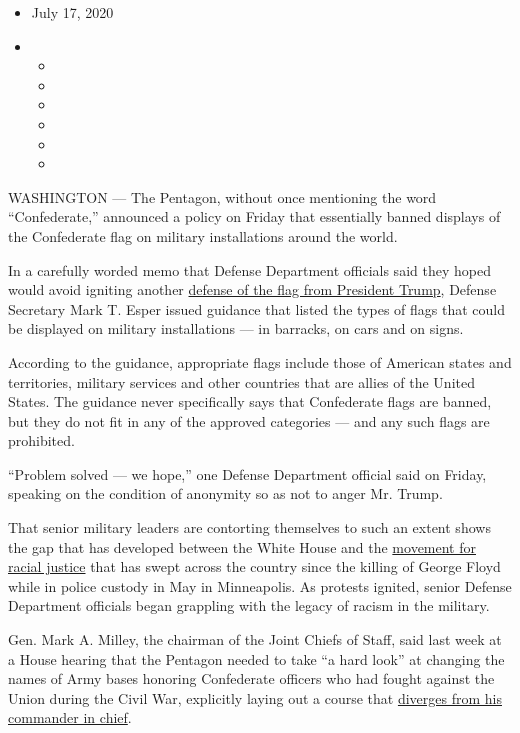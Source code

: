 \begin{itemize}
\item
  July 17, 2020
\item
  \begin{itemize}
  \item
  \item
  \item
  \item
  \item
  \item
  \end{itemize}
\end{itemize}

WASHINGTON --- The Pentagon, without once mentioning the word
``Confederate,'' announced a policy on Friday that essentially banned
displays of the Confederate flag on military installations around the
world.

In a carefully worded memo that Defense Department officials said they
hoped would avoid igniting another
\href{https://www.nytimes.com/2020/07/06/us/politics/trump-bubba-wallace-nascar.html}{defense
of the flag from President Trump}, Defense Secretary Mark T. Esper
issued guidance that listed the types of flags that could be displayed
on military installations --- in barracks, on cars and on signs.

According to the guidance, appropriate flags include those of American
states and territories, military services and other countries that are
allies of the United States. The guidance never specifically says that
Confederate flags are banned, but they do not fit in any of the approved
categories --- and any such flags are prohibited.

``Problem solved --- we hope,'' one Defense Department official said on
Friday, speaking on the condition of anonymity so as not to anger Mr.
Trump.

That senior military leaders are contorting themselves to such an extent
shows the gap that has developed between the White House and the
\href{https://www.nytimes.com/2020/06/07/us/unrest-protests-minneapolis-ending.html}{movement
for racial justice} that has swept across the country since the killing
of George Floyd while in police custody in May in Minneapolis. As
protests ignited, senior Defense Department officials began grappling
with the legacy of racism in the military.

Gen. Mark A. Milley, the chairman of the Joint Chiefs of Staff, said
last week at a House hearing that the Pentagon needed to take ``a hard
look'' at changing the names of Army bases honoring Confederate officers
who had fought against the Union during the Civil War, explicitly laying
out a course that
\href{https://www.nytimes.com/2020/06/10/us/politics/trump-rejects-renaming-military-bases.html}{diverges
from his commander in chief}.

